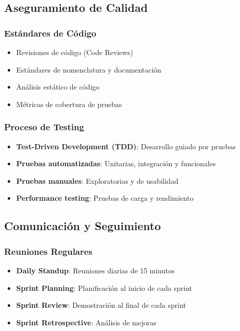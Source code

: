 \subsection{Aseguramiento de Calidad}

\subsubsection{Estándares de Código}
\begin{itemize}
    \item Revisiones de código (Code Reviews)
    \item Estándares de nomenclatura y documentación
    \item Análisis estático de código
    \item Métricas de cobertura de pruebas
\end{itemize}

\subsubsection{Proceso de Testing}
\begin{itemize}
    \item \textbf{Test-Driven Development (TDD)}: Desarrollo guiado por pruebas
    \item \textbf{Pruebas automatizadas}: Unitarias, integración y funcionales
    \item \textbf{Pruebas manuales}: Exploratorias y de usabilidad
    \item \textbf{Performance testing}: Pruebas de carga y rendimiento
\end{itemize}

\subsection{Comunicación y Seguimiento}

\subsubsection{Reuniones Regulares}
\begin{itemize}
    \item \textbf{Daily Standup}: Reuniones diarias de 15 minutos
    \item \textbf{Sprint Planning}: Planificación al inicio de cada sprint
    \item \textbf{Sprint Review}: Demostración al final de cada sprint
    \item \textbf{Sprint Retrospective}: Análisis de mejoras
\end{itemize}

